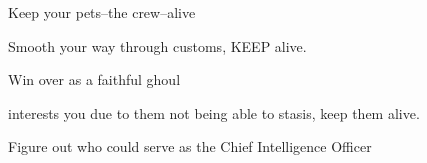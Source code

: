 \documentclass[char]{guildcamp4}
\begin{document}
 

\begin{itemz}[Goals]
	\item Keep your pets--the crew--alive
	\item Smooth your way through customs, KEEP \cCbad{} alive.
	\item Win over \cSpite{} as a faithful ghoul
	\item \cPlead{} interests you due to them not being able to stasis, keep them alive. 
	\item Figure out who could serve as the Chief Intelligence Officer

\end{itemz}

\begin{itemz}[Notes]
	\item 
\end{itemz}

\begin{contacts}
	\contact{\cVtwo{}} 
	\contact{\cVthree{}}
	\contact{\cJoan{}}
	\contact{\cJulie{}}
	\contact{\cJames{}}
	\contact{\cRasputin{}}
	\contact{\cSpite{}}
	\contact{\cPlead{}}
\end{contacts}
\end{document}
